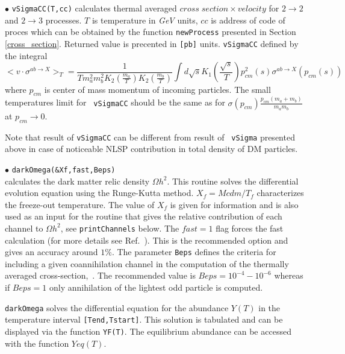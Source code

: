 \documentclass[12pt,a4paper]{article}
\begin{document}
\noindent
 $\bullet$    \verb|vSigmaCC(T,cc)| calculates  thermal  averaged  $cross\;
section
\times velocity$ for $2\to2$ and $2\to3$ processes. $T$ is temperature in
{\it GeV} units,  $cc$ is address of code of proces
which can be obtained by the function {\tt newProcess} presented in  Section
\ref{cross_section}.
 Returned value  is precented in {\tt [pb]} units. {\tt vSigmaCC} defined by
the
integral
$$ <v\cdot \sigma^{ab\to X}>_T=  \frac{1}{T m_a^2 m_b^2
K_2(\frac{m_a}{T})K_2(\frac{m_b}{T})} \int d\sqrt{s}
K_1(\frac{\sqrt{s}}{T})p_{cm}^2(s)\sigma^{ab\to X}(p_{cm}(s)) $$  
where $p_{cm}$ is center of mass momentum of incoming particles.  The small
temperatures limit for  {\tt
vSigmaCC} should be the same as for
$\sigma(p_{cm})\frac{p_{cm}(m_a+m_b)}{m_a m_b}$
at $p_{cm}\to 0$.

Note  that  result of {\tt vSigmaCC} can be different from result of {\tt
vSigma} presented above in case of noticeable  NLSP contribution in total
density of DM particles.    

    
\noindent 
$\bullet$ \verb|darkOmega(&Xf,fast,Beps)|\\
calculates the dark matter relic density $\Omega h^2$. 
This routine  solves the differential evolution equation  using the Runge-Kutta method. 
$X_f=Mcdm/T_{f}$
characterizes the freeze-out temperature.   The value of $X_f$ is given for
information and is also used as an input for the routine that
gives the relative contribution of each channel to $\Omega h^2$,
see \verb|printChannels|  below. The  $fast=1$ flag forces the
fast calculation (for more details see
Ref.~\cite{Belanger:2004yn}). This is the recommended option and
gives an accuracy around $1\%$. The parameter {\tt Beps} defines the
criteria for including a given coannihilation channel in the computation of the
thermally averaged cross-section,~\cite{Belanger:2004yn}.   The
recommended value is $Beps=10^{-4} - 10^{-6}$ whereas 
if $Beps=1$ only annihilation of the
lightest odd particle is computed.
   
\verb|darkOmega| solves the differential equation for the abundance $Y(T)$   in the 
temperature interval {\tt [Tend,Tstart]}.  This solution is tabulated and can be displayed  via the
function {\tt YF(T)}. The equilibrium abundance can be accessed  with the function
$Yeq(T)$. 
\end{document}
